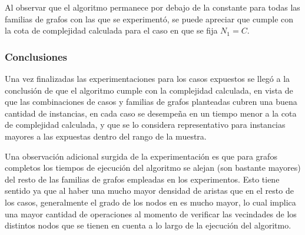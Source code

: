 Al observar que el algoritmo permanece por debajo de la constante para todas
las familias de grafos con las que se experimentó, se puede apreciar que
cumple con la cota de complejidad calculada para el caso en que se fija
$N_1 = C$.

\subsubsection{Conclusiones}

Una vez finalizadas las experimentaciones para los casos expuestos se llegó a
la conclusión de que el algoritmo cumple con la complejidad calculada, en
vista de que las combinaciones de casos y familias de grafos planteadas cubren
una buena cantidad de instancias, en cada caso se desempeña en un tiempo menor
a la cota de complejidad calculada, y que se lo considera representativo para
instancias mayores a las expuestas dentro del rango de la muestra.

Una observación adicional surgida de la experimentación es que para grafos
completos los tiempos de ejecución del algoritmo se alejan (son bastante
mayores) del resto de las familias de grafos empleadas en los experimentos.
Esto tiene sentido ya que al haber una mucho mayor densidad de aristas que en
el resto de los casos, generalmente el grado de los nodos en es mucho mayor,
lo cual implica una mayor cantidad de operaciones al momento de verificar
las vecindades de los distintos nodos que se tienen en cuenta a lo largo de la
ejecución del algoritmo.